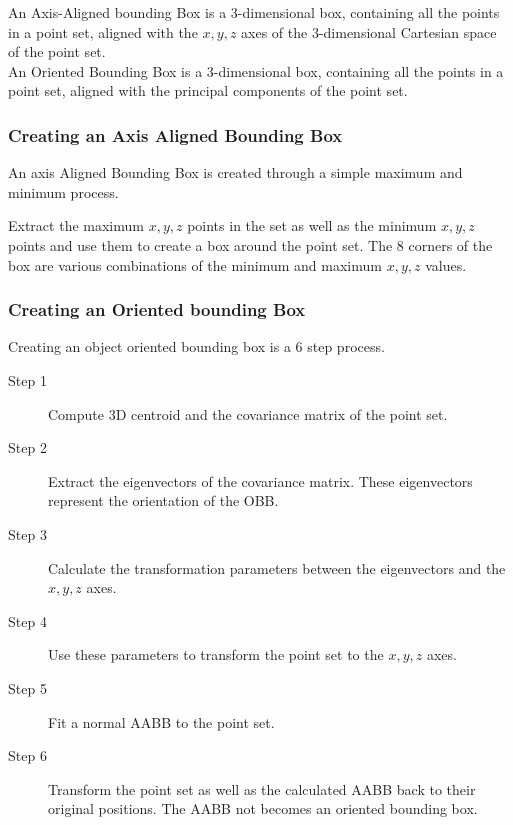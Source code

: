 		An Axis-Aligned bounding Box is a 3-dimensional box, containing all the points in a point set, aligned with the $x,y,z$ axes of the 3-dimensional Cartesian space of the point set.\\
		
		An Oriented Bounding Box is a 3-dimensional box, containing all the points in a point set, aligned with the principal components of the point set.
		
		\subsubsection{Creating an Axis Aligned Bounding Box}
			An axis Aligned Bounding Box is created through a simple maximum and minimum process.
			
			Extract the maximum $x,y,z$ points in the set as well as the minimum $x,y,z$ points and use them to create a box around the point set. The 8 corners of the box are various combinations of the minimum and maximum $x, y, z$ values.
		
		\subsubsection{Creating an Oriented bounding Box}
			Creating an object oriented bounding box is a 6 step process.
			\begin{description}
				\item[Step 1] Compute 3D centroid and the covariance matrix of the point set.
									
				\item[Step 2] Extract the eigenvectors of the covariance matrix. These eigenvectors represent the orientation of the OBB.
				
				\item[Step 3] Calculate the transformation parameters between the eigenvectors and the $x,y,z$ axes.
				
				\item[Step 4] Use these parameters to transform the point set to the $x,y,z$ axes.
				
				\item[Step 5] Fit a normal AABB to the point set.
				
				\item[Step 6] Transform the point set as well as the calculated AABB back to their original positions. The AABB not becomes an oriented bounding box.
			\end{description}
			
